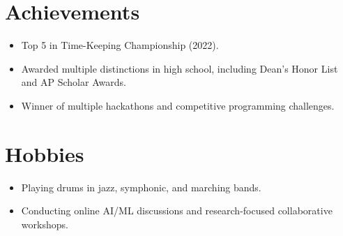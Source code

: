 \documentclass[letterpaper,11pt]{article}
\newcommand{\resumeItem}[1]{
  \item\small{
    {#1 \vspace{-2pt}}
  }
}
\newcommand{\resumeSubHeadingListStart}{\begin{itemize}[leftmargin=0.15in, label={}]}
\newcommand{\resumeSubHeadingListEnd}{\end{itemize}}
\begin{document}
\section{Achievements}
\resumeSubHeadingListStart
  \resumeItem{Top 5 in Time-Keeping Championship (2022).}
  \resumeItem{Awarded multiple distinctions in high school, including Dean's Honor List and AP Scholar Awards.}
  \resumeItem{Winner of multiple hackathons and competitive programming challenges.}
\resumeSubHeadingListEnd

\section{Hobbies}
\resumeSubHeadingListStart
  \resumeItem{Playing drums in jazz, symphonic, and marching bands.}
  \resumeItem{Conducting online AI/ML discussions and research-focused collaborative workshops.}
\resumeSubHeadingListEnd
\end{document}
